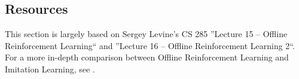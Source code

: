 
\subsection{Resources}
This section is largely based on Sergey Levine’s CS 285 ''Lecture 15 – Offline Reinforcement Learning`` and ''Lecture 16 – Offline Reinforcement Learning 2``\cite{CS285,CS285LevineYoutube}. For a more in-depth comparison between Offline Reinforcement 
Learning and Imitation Learning, see \cite{kumar2022preferofflinereinforcementlearning}.

